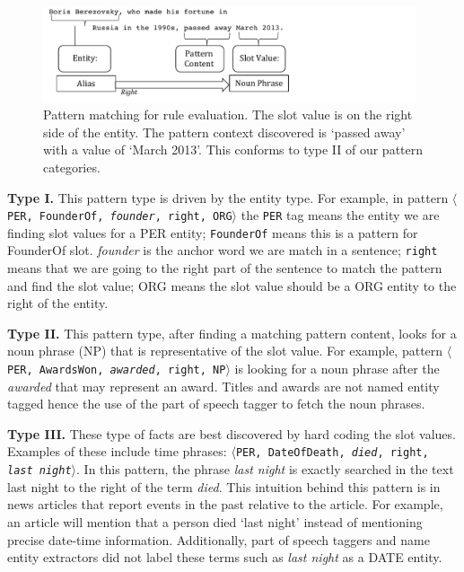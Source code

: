 \begin{figure}
\centering
\includegraphics[width = 11cm]{./images/Pattern-crop.pdf}
\vspace*{-.1in}
\caption{Pattern matching for rule evaluation. The slot value is on the right side of the 
entity. The pattern context discovered is `passed away' with a value of `March 2013'. This conforms to type II of our pattern categories.}\label{fig:pattern}
\vspace*{-.2in}
\end{figure}
 
\textbf{Type I.} This pattern type is driven by the entity type.
For example, in pattern $\langle$\texttt{PER, FounderOf, \textit{founder}, right, ORG}$\rangle$ the \texttt{PER} 
tag means the entity we are finding slot values for a PER entity;
\texttt{FounderOf} means this is a pattern for FounderOf slot.
\textit{founder} is the anchor word we are match in a sentence;
\texttt{right} means that we are going to the right part of the sentence to match the pattern and find the slot value;
ORG means the slot value should be a ORG entity to the right of the entity.

\textbf{Type II.} This pattern type, after finding a matching pattern content, looks for a noun phrase (NP)
that is representative of the slot value.
For example, pattern $\langle$\texttt{PER, AwardsWon, \textit{awarded}, right, NP}$\rangle$
is looking for a noun phrase after the \textit{awarded} that may represent an award.
Titles and awards are not named entity tagged hence the use of the part of speech tagger to fetch the noun phrases.

\textbf{Type III.} These type of facts are best discovered by hard coding the slot values.
Examples of these include time phrases: $\langle$\texttt{PER, DateOfDeath, \textit{died}, right, \textit{last night}}$\rangle$.
In this pattern, the phrase \textit{last night} is exactly searched in the text {last night} to the right of the term \textit{died}.
This intuition behind this pattern is in news articles that report events in the past relative to the article. 
For example, an article will mention that  
a person died `last night' instead of mentioning precise date-time information.
Additionally, part of speech taggers and name entity extractors did not label these terms such as 
\textit{last night} as a DATE entity. 


